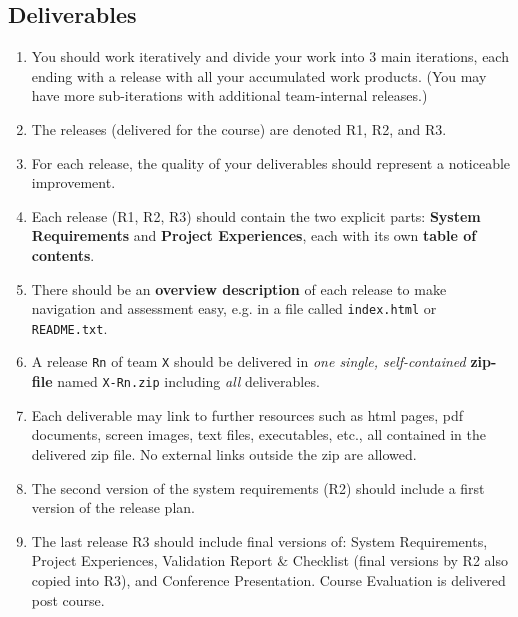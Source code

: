 \documentclass[10pt,a4paper]{article}
\begin{document}
\subsection{Deliverables}
  \begin{enumerate}[nolistsep]
    \item You should work iteratively and divide your work into 3 main iterations, each ending with a release with all your accumulated work products. (You may have more sub-iterations with additional team-internal releases.)
    \item The releases (delivered for the course) are denoted R1, R2, and R3.
    \item For each release, the quality of your deliverables should represent a noticeable improvement.
    \item Each release (R1, R2, R3) should contain the two explicit parts: {\bf System Requirements} and {\bf Project Experiences}, each with its own {\bf table of contents}.
    \item There should be an {\bf overview description} of each release to make navigation and assessment easy, e.g. in a file called \verb+index.html+ or \verb+README.txt+.
    \item A release \verb+Rn+ of team \verb+X+ should be delivered in {\it one single, self-contained} {\bf zip-file} named \verb+X-Rn.zip+ including {\it all} deliverables. %
    \item Each deliverable may link to further resources such as html pages, pdf documents, screen images, text files, executables, etc., all contained in the delivered zip file. No external links outside the zip are allowed.
    \item The second version of the system requirements (R2) should include a first version of the release plan.
    \item The last release R3 should include final versions of: System Requirements, Project Experiences, Validation Report \& Checklist (final versions by R2 also copied into R3), and Conference Presentation. Course Evaluation is delivered post course.


\end{enumerate}
\end{document}
